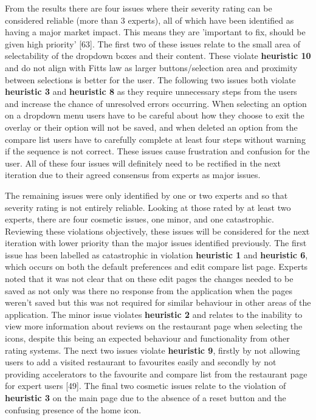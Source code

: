 \documentclass[a4 paper, 12pt]{article}
\begin{document}
     From the results there are four issues where their severity rating can be considered reliable (more than 3 experts), all of which have been identified as having a major market impact. This means they are 'important to fix, should be given high priority' [63]. The first two of these issues relate to the small area of selectability of the dropdown boxes and their content. These violate \textbf{heuristic 10} and do not align with Fitts law as larger buttons/selection area and proximity between selections is better for the user. The following two issues both violate \textbf{heuristic 3} and \textbf{heuristic 8} as they require unnecessary steps from the users and increase the chance of unresolved errors occurring. When selecting an option on a dropdown menu users have to be careful about how they choose to exit the overlay or their option will not be saved, and when deleted an option from the compare list users have to carefully complete at least four steps without warning if the sequence is not correct. These issues cause frustration and confusion for the user. All of these four issues will definitely need to be rectified in the next iteration due to their agreed consensus from experts as major issues.

     The remaining issues were only identified by one or two experts and so that severity rating is not entirely reliable. Looking at those rated by at least two experts, there are four cosmetic issues, one minor, and one catastrophic. Reviewing these violations objectively, these issues will be considered for the next iteration with lower priority than the major issues identified previously. The first issue has been labelled as catastrophic in violation \textbf{heuristic 1} and \textbf{heuristic 6}, which occurs on both the default preferences and edit compare list page. Experts noted that it was not clear that on these edit pages the changes needed to be saved as not only was there no response from the application when the pages weren't saved but this was not required for similar behaviour in other areas of the application. The minor issue violates \textbf{heuristic 2} and relates to the inability to view more information about reviews on the restaurant page when selecting the icons, despite this being an expected behaviour and functionality from other rating systems. The next two issues violate \textbf{heuristic 9}, firstly by not allowing users to add a visited restaurant to favourites easily and secondly by not providing accelerators to the favourite and compare list from the restaurant page for expert users [49]. The final two cosmetic issues relate to the violation of \textbf{heuristic 3} on the main page due to the absence of a reset button and the confusing presence of the home icon. 
          
\end{document}
